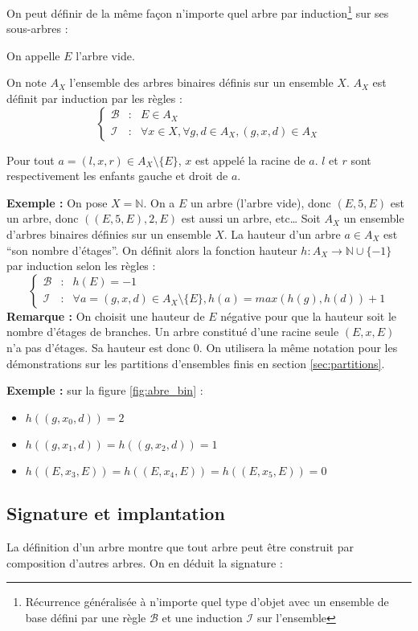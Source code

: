 \documentclass[../../../main.tex]{subfiles}
\begin{document}
On peut définir de la même façon n'importe quel arbre par induction\footnote{Récurrence généralisée à n'importe quel type d'objet avec un ensemble de base défini par une règle $\mathcal{B}$ et une induction $\mathcal{I}$ sur l'ensemble} sur ses sous-arbres :
 {
On appelle $E$ l'arbre vide. 

On note $A_{X}$ l'ensemble des arbres binaires définis sur un ensemble $X$. $A_{X}$ est définit par induction par les règles :
$$\left\{\begin{array}{cll}
	\mathcal{B} & : & E\in{A_{X}} \\
	\mathcal{I} & : & \forall{x\in{X}}, \forall{g, d\in{A_{X}}}, (g, x, d)\in{A_{X}}
\end{array}\right.$$

Pour tout $a = (l, x, r)\in{A_{X}\setminus{\{E\}}}$, $x$ est appelé la racine de $a$. $l$ et $r$ sont respectivement les enfants gauche et droit de $a$.
}
\textbf{Exemple :} On pose $X = \mathbb{N}$. On a $E$ un arbre (l'arbre vide), donc $(E, 5, E)$ est un arbre, donc $((E, 5, E), 2, E)$ est aussi un arbre, etc\dots
{} {
Soit $A_X$ un ensemble d'arbres binaires définies sur un ensemble $X$. La hauteur d'un arbre $a\in A_X$ est ``son nombre d'étages''. On définit alors la fonction hauteur $h : A_{X} \rightarrow{\mathbb{N}\cup\{-1\}}$ par induction selon les règles :
$$\left\{\begin{array}{cll}
	\mathcal{B} & : & h(E) = -1 \\
	\mathcal{I} & : & \forall{a = (g, x, d)\in{A_{X}}\setminus{\{E\}}}, h(a) = max(h(g), h(d)) + 1
\end{array}\right.$$
}
\textbf{Remarque :} On choisit une hauteur de $E$ négative pour que la hauteur soit le nombre d'étages de branches. Un arbre constitué d'une racine seule $(E, x, E)$ n'a pas d'étages. Sa hauteur est donc $0$. On utilisera la même notation pour les démonstrations sur les partitions d'ensembles finis en section \ref{sec:partitions}.

\textbf{Exemple :} sur la figure \ref{fig:abre_bin} :
\begin{itemize}
	\item $h((g, x_0, d)) = 2$
	\item $h((g, x_1, d)) = h((g, x_2, d)) = 1$
	\item $h((E, x_3, E)) = h((E, x_4, E)) = h((E, x_5, E)) = 0$
\end{itemize}
\subsection{Signature et implantation}
La définition d'un arbre montre que tout arbre peut être construit par composition d'autres arbres. On en déduit la signature :
\end{document}
